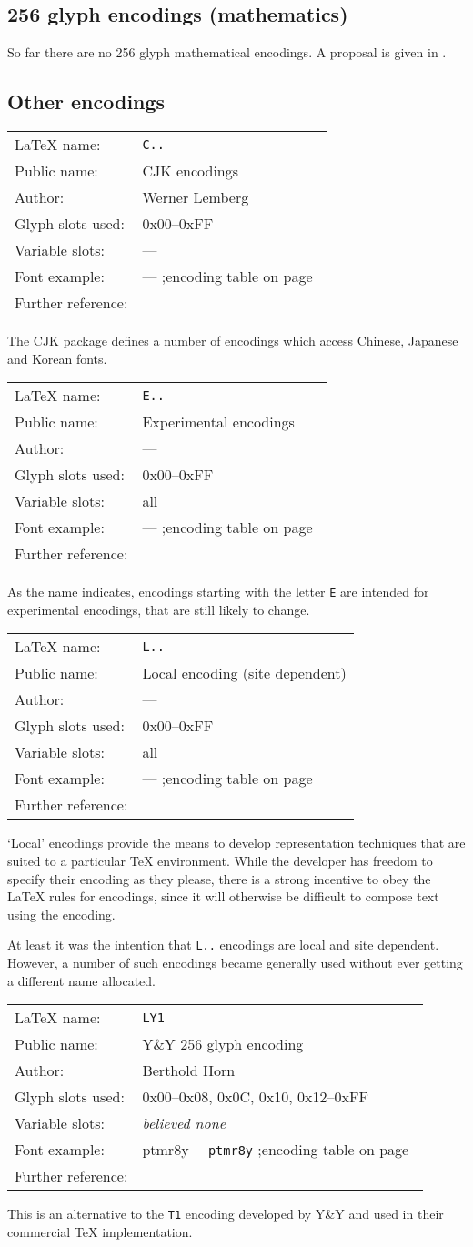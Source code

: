 \documentclass{ltxguide}[1994/11/20]
\makeatletter
\providecommand{\Enc}[1]{\texttt{#1}}
\providecommand{\Pkg}[1]{%
  \textsf{#1}}
\newenvironment{encodinginfo}[7]%
  {\noindent
   \begin{tabularx}{\linewidth}{@{}l>{\raggedright\let\\\tabularnewline}X}%
     \LaTeX{} name:          & \texttt{#1}\\%
     Public name:          & #2\\%
     Author:                   & #3\\%
     Glyph slots used: & #4\\%
     Variable slots:     & #5\\%
     Font example:     & \def\@tempa{#6}\ifx\@tempa\@empty---%
                            \else\texttt{#6}\referenceftable{#6}\fi\\%
     Further reference:                & #7%
   \end{tabularx}%
   \par\nobreak
   \vspace*{3pt}%
   \quote
  }%
  {\endquote
   \vspace{6pt}}
\def\referenceftable#1{
  \@ifundefined{r@fonttable:#1}%
  \relax
  {;\space encoding table on page~\pageref{fonttable:#1}}%
}
\makeatother
\begin{document}
\subsection{256 glyph encodings (mathematics)}

So far there are no 256 glyph mathematical encodings. A proposal is
given in \cite{ziegler}.


\subsection{Other encodings}

\begin{encodinginfo}
  {C..}
  {CJK encodings}
  {Werner Lemberg}
  {0x00--0xFF}
  {---}
  {} %
  {\cite{CJK}}

  The \Pkg{CJK} package defines a number of encodings which access Chinese,
  Japanese and Korean fonts.

\end{encodinginfo}

\begin{encodinginfo}
  {E..}
  {Experimental encodings}
  {---}
  {0x00--0xFF}
  {all}
  {}
  {\cite[p.416]{A-W:MG2004}}

  As the name indicates, encodings starting with the letter \Enc{E} are
  intended for experimental encodings, that are still likely to change.
\end{encodinginfo}

\begin{encodinginfo}{L..}
        {Local encoding (site dependent)}
        {---}
        {0x00--0xFF}
        {all}
        {}
        {\cite[p.416]{A-W:MG2004}}

        `Local' encodings provide the means to develop representation
        techniques that are suited to a particular \TeX{} environment.  While
        the developer has freedom to specify their encoding as they
        please, there is a strong incentive to obey the \LaTeX{} rules for
        encodings, since it will otherwise be difficult to compose text using
        the encoding.

        At least it was the intention that \Enc{L..} encodings are local and
        site dependent. However, a number of such encodings became generally
        used without ever getting a different name allocated.

\end{encodinginfo}



\begin{encodinginfo}{LY1}
        {Y\&Y 256 glyph encoding}
        {Berthold Horn}
        {0x00--0x08, 0x0C, 0x10, 0x12--0xFF}
        {\emph{believed none}}
        {ptmr8y}
        {\cite[p.416]{A-W:MG2004}}

        This is an alternative to the \Enc{T1} encoding developed by Y\&Y and
        used in their commercial \TeX{} implementation.

\end{encodinginfo}
\end{document}
